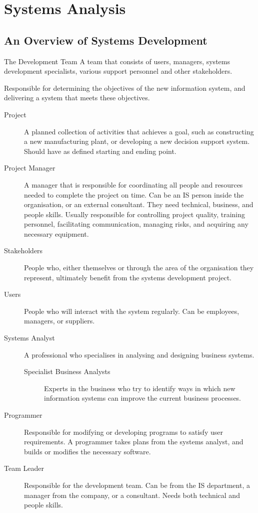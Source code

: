 \documentclass[\main/notes.tex]{subfiles}
\begin{document}
	\setcounter{chapter}{10}
	\chapter{Systems Analysis}
		\section{An Overview of Systems Development}
			\begin{definition}{The Development Team}
				A team that consists of users, managers, systems development specialists, various support personnel and other stakeholders.

				Responsible for determining the objectives of the new information system, and delivering a system that meets these objectives.

				\begin{description}
					\item[Project] A planned collection of activities that achieves a goal, such as constructing a new manufacturing plant, or developing a new decision support system. Should have as defined starting and ending point.
					\item[Project Manager] A manager that is responsible for coordinating all people and resources needed to complete the project on time. Can be an IS person inside the organisation, or an external consultant. They need technical, business, and people skills. Usually responsible for controlling project quality, training personnel, facilitating communication, managing risks, and acquiring any necessary equipment.
					\item[Stakeholders] People who, either themselves or through the area of the organisation they represent, ultimately benefit from the systems development project.
					\item[Users] People who will interact with the system regularly. Can be employees, managers, or suppliers.
					\item[Systems Analyst] A professional who specialises in analysing and designing business systems.
						\begin{description}
							\item[Specialist Business Analysts] Experts in the business who try to identify ways in which new information systems can improve the current business processes.
						\end{description}
					\item[Programmer] Responsible for modifying or developing programs to satisfy user requirements. A programmer  takes plans from the systems analyst, and builds or modifies the necessary software.
					\item[Team Leader] Responsible for the development team. Can be from the IS department, a manager from the company, or a consultant. Needs both technical and people skills.
				\end{description}
			\end{definition}
\end{document}
